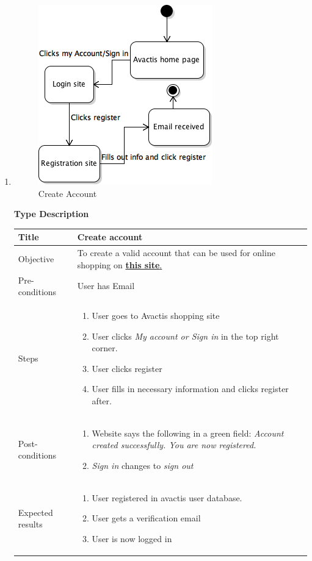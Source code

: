 \documentclass[UKenglish,12pt]{article}
\begin{document}
\begin{enumerate}%
\item
\begin{figure}[H]
\centering
\includegraphics[scale=0.7,keepaspectratio]{Images/CreateAccount.png}
\caption{Create Account}
\end{figure}

\newpage
\textbf{\hspace{0.3cm}Type\hspace{4.4cm} Description}
\newline \vspace{0.2cm}
\begin{tabular}{| p{5cm} | p{10cm} | }
	\hline
	 Title & Create account\\ \hline
	 Objective & To create a valid account that can be used for online shopping on \href{http://demo.avactis.com/4.7.9/}{\textbf{this site}.} \\ \hline
	 Pre-conditions & User has Email\\ \hline
	 Steps & \begin{enumerate} \item User goes to Avactis shopping site \item User clicks \textit{My account or  Sign in} in the top right corner. \item User clicks register \item User fills in necessary information and clicks register after.\end{enumerate} \\ \hline
	 Post-conditions & \begin{enumerate} \item Website says the following in a green field: \textit{Account created successfully. You are now registered.} \item \textit{Sign in} changes to \textit{sign out} \end{enumerate}\\ \hline
	 Expected results & \begin{enumerate} \item User registered in avactis user database. \item User gets a verification email \item User is now logged in \end{enumerate}\\ 
	 \hline
\end{tabular} %


\end{enumerate}
\end{document}
